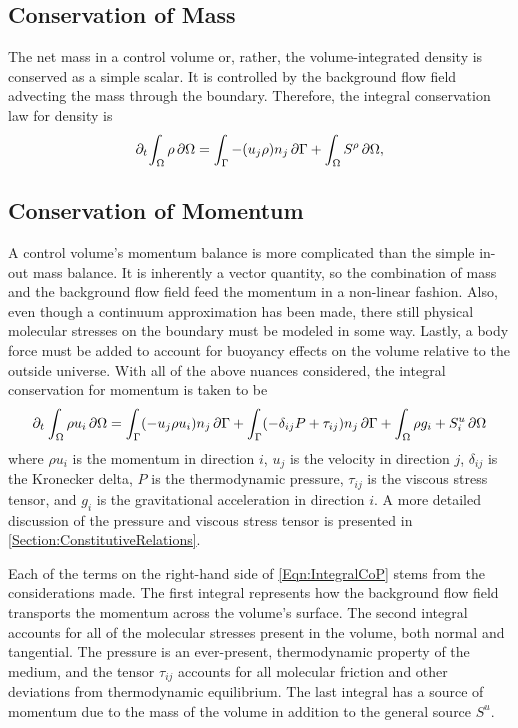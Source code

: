 \documentclass[12pt]{../UWMadThesis}
\begin{document}
\subsection{Conservation of Mass}
The net mass in a control volume or, rather, the volume-integrated density is conserved as a simple scalar.
It is controlled by the background flow field advecting the mass through the boundary.
Therefore, the integral conservation law for density is
\begin{equation}
    \partial_t\:\!\!\int_{\Omega} \rho \,\partial\Omega = \int_{\Gamma} -(u_j \rho)n_j\,\partial\Gamma + \int_{\Omega} S^\rho\,\partial\Omega,
\end{equation}

\subsection{Conservation of Momentum}
A control volume's momentum balance is more complicated than the simple in-out mass balance.
It is inherently a vector quantity, so the combination of mass and the background flow field feed the momentum in a non-linear fashion.
Also, even though a continuum approximation has been made, there still physical molecular stresses on the boundary must be modeled in some way.
Lastly, a body force must be added to account for buoyancy effects on the volume relative to the outside universe.
With all of the above nuances considered, the integral conservation for momentum is taken to be
\begin{equation}
    \partial_t\:\! \int_{\Omega} \rho u_i \,\partial\Omega = \int_{\Gamma} (-u_j \rho u_i) n_j \,\partial\Gamma + \int_{\Gamma} (-\delta_{ij} P + \tau_{ij}) n_j \,\partial\Gamma + \int_{\Omega} \rho g_i + S^u_i \,\partial\Omega
    \label{Eqn:IntegralCoP}
\end{equation}
where $\rho{u_i}$ is the momentum in direction $i$, $u_j$ is the velocity in direction $j$, $\delta_{ij}$ is the Kronecker delta, $P$ is the thermodynamic pressure, $\tau_{ij}$ is the viscous stress tensor, and $g_i$ is the gravitational acceleration in direction $i$.
A more detailed discussion of the pressure and viscous stress tensor is presented in \cref{Section:ConstitutiveRelations}.

Each of the terms on the right-hand side of \cref{Eqn:IntegralCoP} stems from the considerations made.
The first integral represents how the background flow field transports the momentum across the volume's surface.
The second integral accounts for all of the molecular stresses present in the volume, both normal and tangential.
The pressure is an ever-present, thermodynamic property of the medium, and the tensor $\tau_{ij}$ accounts for all molecular friction and other deviations from thermodynamic equilibrium.
The last integral has a source of momentum due to the mass of the volume in addition to the general source $S^u$.
\end{document}
